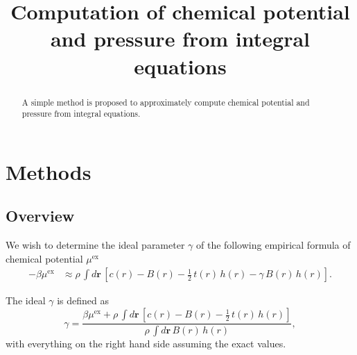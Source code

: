 \documentclass[preprint]{revtex4-1}
\newcommand{\vct}[1]{\mathbf{#1}}
\providecommand{\vr}{} %
\renewcommand{\vr}{\vct{r}}
\newcommand{\supex}[1]{ { { #1 }^{ \mathrm{ex} } } }
\newcommand{\muex}{\supex{\mu}}
\begin{document}
\title{Computation of chemical potential and pressure from integral equations}

\begin{abstract}
  A simple method is proposed to approximately compute chemical potential and pressure
  from integral equations.
\end{abstract}




\section{Methods}

\subsection{Overview}

We wish to determine the ideal parameter $\gamma$
of the following empirical formula of chemical potential $\muex$
%
\begin{align}
  -\beta \muex
  &\approx
    \rho \, \int d\vr \,
    \left[
      c(r) - B(r) - \frac{1}{2} \, t(r) \, h(r)
      -\gamma \, B(r) \, h(r)
    \right].
  \label{eq:mutiapprox}
\end{align}
%



The ideal $\gamma$ is defined as
%
\begin{equation}
  \gamma =
\frac{
  \beta \muex + \rho \, \int d\vr \,
    \left[
      c(r) - B(r) - \frac{1}{2} \, t(r) \, h(r)
    \right]
  }
  {
    \rho \, \int d\vr \, B(r) \, h(r)
  },
  \label{eq:solvegamma}
\end{equation}
with everything on the right hand side assuming the exact values.
\end{document}

